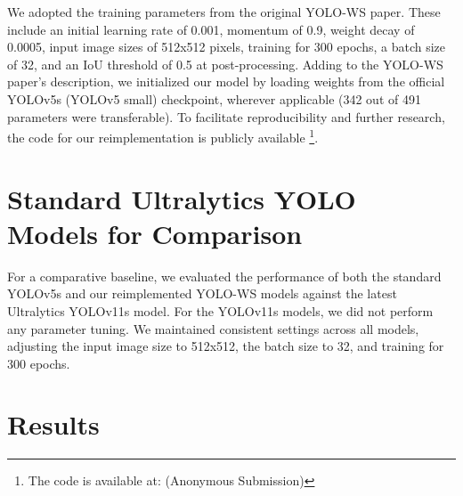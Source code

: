 \documentclass[conference]{IEEEtran}
\begin{document}
We adopted the training parameters from the original YOLO-WS paper. These include an initial learning rate of 0.001, momentum of 0.9, weight decay of 0.0005, input image sizes of 512x512 pixels, training for 300 epochs, a batch size of 32, and an IoU threshold of 0.5 at post-processing. Adding to the YOLO-WS paper's description, we initialized our model by loading weights from the official YOLOv5s (YOLOv5 small) checkpoint, wherever applicable (342 out of 491 parameters were transferable). To facilitate reproducibility and further research, the code for our reimplementation is publicly available \footnote{The code is available at: (Anonymous Submission)}.

\section{Standard Ultralytics YOLO Models for Comparison}

For a comparative baseline, we evaluated the performance of both the standard YOLOv5s and our reimplemented YOLO-WS models against the latest Ultralytics YOLOv11s model. For the YOLOv11s models, we did not perform any parameter tuning. We maintained consistent settings across all models, adjusting the input image size to 512x512, the batch size to 32, and training for 300 epochs. 

\section{Results}
\end{document}
